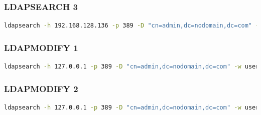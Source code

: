 \documentclass[letterpaper, 12pt]{article}
\let\tempsubsubsection\subsubsection
\renewcommand\subsubsection[1]{\vspace{0cm}\tempsubsubsection{#1}\vspace{0cm}}
\begin{document}
\subsubsection{LDAPSEARCH 3}
\begin{lstlisting}[frame=single, language=bash, caption=3.Befehl]
ldapsearch -h 192.168.128.136 -p 389 -D "cn=admin,dc=nodomain,dc=com" -w user -b "dc=nodomain,dc=com"
\end{lstlisting} 
\subsubsection{LDAPMODIFY 1}
\begin{lstlisting}[frame=single, language=bash, caption=4.Befehl]
ldapsearch -h 127.0.0.1 -p 389 -D "cn=admin,dc=nodomain,dc=com" -w user
\end{lstlisting} 
\subsubsection{LDAPMODIFY 2}
\begin{lstlisting}[frame=single, language=bash, caption=5.Befehl]
ldapsearch -h 127.0.0.1 -p 389 -D "cn=admin,dc=nodomain,dc=com" -w user
\end{lstlisting} 
\newpage



\lstlistoflistings
\listoffigures
\end{document}
